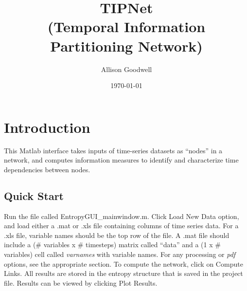 \documentclass[a4paper]{article}
\title{TIPNet \\ (Temporal Information Partitioning Network)}
\author{Allison Goodwell}
\date{\today}
\begin{document}
\maketitle

\section{Introduction}

This Matlab interface takes inputs of time-series datasets as ``nodes'' in a network, and computes information measures to identify and characterize time dependencies between nodes.

\subsection{Quick Start}
Run the file called EntropyGUI\_mainwindow.m.  Click Load New Data option, and load either a .mat or .xls file containing columns of time series data.  For a .xls file, variable names should be the top row of the file.  A .mat file should include a (\# variables x \# timesteps) matrix called ``data'' and a (1 x \# variables)  cell called \textit{varnames} with variable names.  For any processing or \textit{pdf} options, see the appropriate section.  To compute the network, click on Compute Links.  All results are stored in the entropy structure that is saved in the project file.  Results can be viewed by clicking Plot Results.
\end{document}
